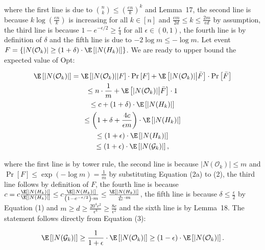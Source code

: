 \documentclass[10pt,a4paper]{article}
\begin{document}
where the first line is due to $\binom{n}{k}\leq\left(\frac{en}{k}\right)^{k}$ and Lemma 17, the second line is because $k\log\left(\frac{en}{k}\right)$ is increasing for all $k\in[n]$ and $\frac{\epsilon m}{2d}\leq k\leq\frac{2m}{\epsilon d}$ by assumption, the third line is because $1-e^{-\epsilon/2}\geq\frac{\epsilon}{4}$ for all $\epsilon\in(0,1)$, the fourth line is by definition of $\delta$ and the fifth line is due to $-2\log{m}\leq-\log{m}$.
Let event $F=\{|N(\mathcal{O}_{k})|\geq(1+\delta)\cdot\E\left[|N(H_{k})|\right]\}$.
We are ready to upper bound the expected value of Opt:\par


\[\begin{gathered}
\displaystyle\E\left[|N(\mathcal{O}_{k})|\right] \displaystyle=\E\left[|N(\mathcal{O}_{k})|\middle|F\right]\cdot\Pr\left[F\right]+\E\left[|N(\mathcal{O}_{k})|\middle|\bar{F}\right]\cdot\Pr\left[\bar{F}\right] \\
\displaystyle\leq n\cdot\frac{1}{m}+\E\left[|N(\mathcal{O}_{k})|\middle|\bar{F}\right]\cdot 1 \\
\displaystyle\leq c+(1+\delta)\cdot\E\left[|N(H_{k})|\right] \\
\displaystyle\leq\left(1+\delta+\frac{4c}{\epsilon m}\right)\cdot\E\left[|N(H_{k})|\right] \\
\displaystyle\leq\left(1+\epsilon\right)\cdot\E\left[|N(H_{k})|\right] \\
\displaystyle\leq\left(1+\epsilon\right)\cdot\E\left[|N(\mathcal{G}_{k})|\right],
\end{gathered}\]


where the first line is by tower rule, the second line is because $|N(\mathcal{O}_{k})|\leq m$ and $\Pr\left[F\right]\leq\exp\left(-\log{m}\right)=\frac{1}{m}$ by substituting Equation (2a) to (2), the third line follows by definition of $F$, the fourth line is because $c=c\frac{\E\left[|N(H_{k})|\right]}{\E\left[|N(H_{k})|\right]}\leq c\frac{\E\left[|N(H_{k})|\right]}{\left(1-e^{-\epsilon/2}\right)\cdot m}\leq\frac{\E\left[|N(H_{k})|\right]}{\frac{\epsilon}{4c}\cdot m}$, the fifth line is because $\delta\leq\frac{\epsilon}{2}$ by Equation (1) and $m\geq d\geq\frac{20^{4}c^{2}}{\epsilon^{8}}\geq\frac{8c}{\epsilon^{2}}$ and the sixth line is by Lemma 18.
The statement follows directly from Equation (3):\par


\[\begin{gathered}
\displaystyle\E\left[|N(\mathcal{G}_{k})|\right]\geq\frac{1}{1+\epsilon}\cdot\E\left[|N(\mathcal{O}_{k})|\right]\geq\left(1-\epsilon\right)\cdot\E\left[|N(\mathcal{O}_{k})|\right].
\end{gathered}\]
\end{document}
